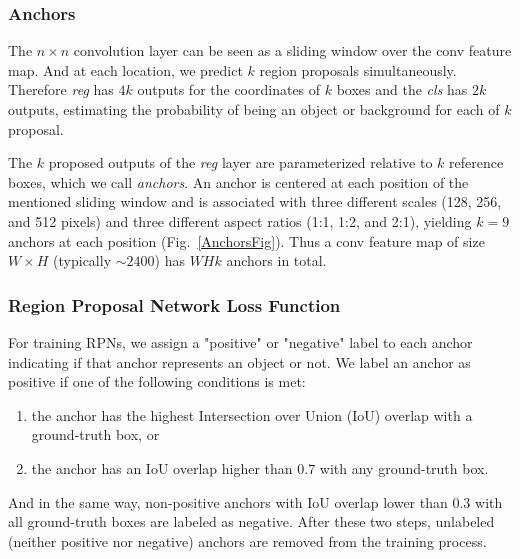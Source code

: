 \documentclass[conference]{IEEEtran}
\begin{document}
\subsubsection{Anchors}
\label{Anchors}
The $n\times n$ convolution layer can be seen as a sliding window over the conv feature map. And at each location, we predict $k$ region proposals simultaneously. Therefore \textit{reg} has $4k$ outputs for the coordinates of $k$ boxes and the \textit{cls} has $2k$ outputs, estimating the probability of being an object or background for each of $k$ proposal.

The $k$ proposed outputs of the \textit{reg} layer are parameterized relative to $k$ reference boxes, which we call \textit{anchors}. An anchor is centered at each position of the mentioned sliding window and is associated with three different scales (128, 256, and 512 pixels) and three different aspect ratios (1:1, 1:2, and 2:1), yielding $k=9$ anchors at each position (Fig.~\ref{AnchorsFig}). Thus a conv feature map of size $W\times H$ (typically $\sim 2400$) has $WHk$ anchors in total.

\subsubsection{Region Proposal Network Loss Function}
For training RPNs, we assign a "positive" or "negative" label to each anchor indicating if that anchor represents an object or not. We label an anchor as positive if one of the following conditions is met:
\begin{enumerate}[label=(\roman*)]
\item the anchor has the highest Intersection over Union (IoU) overlap with a ground-truth box, or
\item the anchor has an IoU overlap higher than $0.7$ with any ground-truth box.
\end{enumerate}
And in the same way, non-positive anchors with IoU overlap lower than $0.3$ with all ground-truth boxes are labeled as negative.
After these two steps, unlabeled (neither positive nor negative) anchors are removed from the training process.
\end{document}
